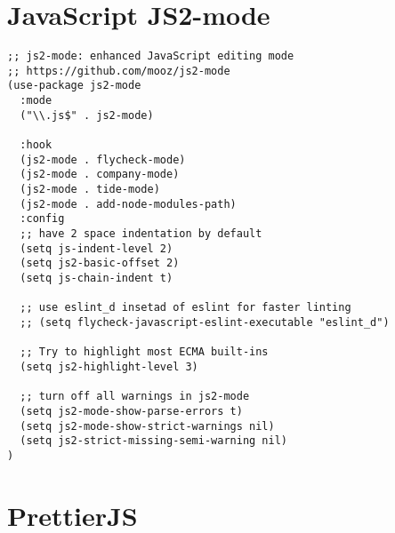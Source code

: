 \documentclass[11pt]{article}
\begin{document}
\section*{JavaScript JS2-mode}
\label{sec:orgf66f5d1}

\begin{verbatim}
;; js2-mode: enhanced JavaScript editing mode
;; https://github.com/mooz/js2-mode
(use-package js2-mode
  :mode
  ("\\.js$" . js2-mode)

  :hook
  (js2-mode . flycheck-mode)
  (js2-mode . company-mode)
  (js2-mode . tide-mode)
  (js2-mode . add-node-modules-path)
  :config
  ;; have 2 space indentation by default
  (setq js-indent-level 2)
  (setq js2-basic-offset 2)
  (setq js-chain-indent t)

  ;; use eslint_d insetad of eslint for faster linting
  ;; (setq flycheck-javascript-eslint-executable "eslint_d")

  ;; Try to highlight most ECMA built-ins
  (setq js2-highlight-level 3)

  ;; turn off all warnings in js2-mode
  (setq js2-mode-show-parse-errors t)
  (setq js2-mode-show-strict-warnings nil)
  (setq js2-strict-missing-semi-warning nil)
)
\end{verbatim}

\section*{PrettierJS}
\label{sec:org93e512b}
\end{document}
